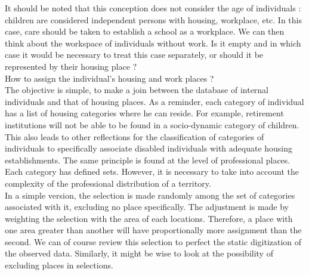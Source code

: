 It should be noted that this conception does not consider the age of individuals : children are considered independent persons with housing, workplace, etc. In this case, care should be taken to establish a school as a workplace. We can then think about the workspace of individuals without work. Is it empty and in which case it would be necessary to treat this case separately, or should it be represented by their housing place ?\\

How to assign the individual's housing and work places ?\\

The objective is simple, to make a join between the database of internal individuals and that of housing places. As a reminder, each category of individual has a list of housing categories where he can reside. For example, retirement institutions will not be able to be found in a socio-dynamic category of children. This also leads to other reflections for the classification of categories of individuals to specifically associate disabled individuals with adequate housing establishments. The same principle is found at the level of professional places. Each category has defined sets. However, it is necessary to take into account the complexity of the professional distribution of a territory.\\

In a simple version, the selection is made randomly among the set of categories associated with it, excluding no place specifically. The adjustment is made by weighting the selection with the area of each locations. Therefore, a place with one area greater than another will have proportionally more assignment than the second. We can of course review this selection to perfect the static digitization of the observed data. Similarly, it might be wise to look at the possibility of excluding places in selections.\\

